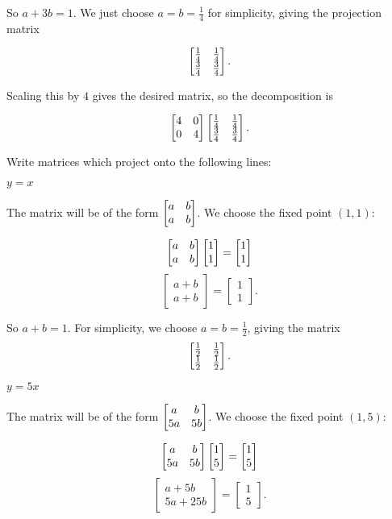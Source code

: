 \documentclass[../gatm_answers.tex]{subfiles}
\begin{document}
\begin{iinner_problem}
\begin{iinner_problem}
\begin{iinner_problem}
So $a+3b = 1$. We just choose $a=b=\frac{1}{4}$ for simplicity, giving the projection matrix

$$\begin{bmatrix} \frac{1}{4} & \frac{1}{4} \\ \frac{3}{4} & \frac{3}{4} \end{bmatrix}.$$

Scaling this by $4$ gives the desired matrix, so the decomposition is

$$\begin{bmatrix} 4 & 0 \\ 0 & 4 \end{bmatrix}\begin{bmatrix} \frac{1}{4} & \frac{1}{4} \\ \frac{3}{4} & \frac{3}{4} \end{bmatrix}.$$

\begin{outer_problem}
\item Write matrices which project onto the following lines:
\end{outer_problem}

\begin{inner_problem}[start=1]
\item $y=x$
\end{inner_problem}

The matrix will be of the form $\begin{bmatrix} a & b \\ a & b \end{bmatrix}$. We choose the fixed point $(1,1)$:

$$\begin{bmatrix} a & b \\ a & b \end{bmatrix}\begin{bmatrix} 1 \\ 1 \end{bmatrix} = \begin{bmatrix} 1 \\ 1 \end{bmatrix}$$
$$\begin{bmatrix} a + b \\ a + b \end{bmatrix} = \begin{bmatrix} 1 \\ 1 \end{bmatrix}.$$

So $a+b=1$. For simplicity, we choose $a=b=\frac{1}{2}$, giving the matrix $$\begin{bmatrix} \frac{1}{2} & \frac{1}{2} \\ \frac{1}{2} & \frac{1}{2} \end{bmatrix}.$$

\begin{inner_problem}
\item $y=5x$
\end{inner_problem}

The matrix will be of the form $\begin{bmatrix} a & b \\ 5a & 5b \end{bmatrix}$. We choose the fixed point $(1,5)$:

$$\begin{bmatrix} a & b \\ 5a & 5b \end{bmatrix}\begin{bmatrix} 1 \\ 5 \end{bmatrix} = \begin{bmatrix} 1 \\ 5 \end{bmatrix}$$
$$\begin{bmatrix} a + 5b \\ 5a + 25b \end{bmatrix} = \begin{bmatrix} 1 \\ 5 \end{bmatrix}.$$


\end{iinner_problem}
\end{iinner_problem}
\end{iinner_problem}
\end{document}
